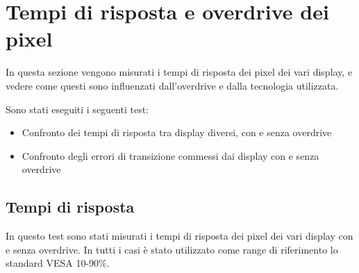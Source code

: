 \section{Tempi di risposta e overdrive dei pixel}
In questa sezione vengono misurati i tempi di risposta dei pixel dei vari display, e vedere come questi sono influenzati dall'overdrive e dalla tecnologia utilizzata.

Sono stati eseguiti i seguenti test:\begin{itemize}
	\item Confronto dei tempi di risposta tra display diversi, con e senza overdrive
	\item Confronto degli errori di transizione commessi dai display con e senza overdrive
\end{itemize}

\subsection{Tempi di risposta}
In questo test sono stati misurati i tempi di risposta dei pixel dei vari display con e senza overdrive. In tutti i casi è stato utilizzato come range di riferimento lo standard VESA 10-90\%.

